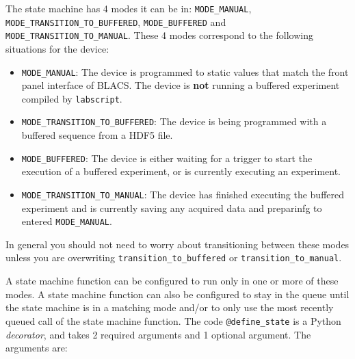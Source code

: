 \documentclass[12pt]{article}
\begin{document}
The state machine has 4 modes it can be in: \texttt{MODE\_MANUAL}, \texttt{MODE\_TRANSITION\_TO\_BUFFERED}, \texttt{MODE\_BUFFERED} and \texttt{MODE\_TRANSITION\_TO\_MANUAL}. These 4 modes correspond to the following situations for the device:

\begin{itemize}
	\item \texttt{MODE\_MANUAL}: The device is programmed to static values that match the front panel interface of BLACS. The device is \textbf{not} running a buffered experiment compiled by \texttt{labscript}.
	\item \texttt{MODE\_TRANSITION\_TO\_BUFFERED}: The device is being programmed with a buffered sequence from a HDF5 file.
	\item \texttt{MODE\_BUFFERED}: The device is either waiting for a trigger to start the execution of a buffered experiment, or is currently executing an experiment.
	\item \texttt{MODE\_TRANSITION\_TO\_MANUAL}: The device has finished executing the buffered experiment and is currently saving any acquired data and preparinfg to entered \texttt{MODE\_MANUAL}.
\end{itemize}

In general you should not need to worry about transitioning between these modes unless you are overwriting \texttt{transition\_to\_buffered} or \texttt{transition\_to\_manual}.

A state machine function can be configured to run only in one or more of these modes.
A state machine function can also be configured to stay in the queue until the state machine is in a matching mode and/or to only use the most recently queued  call of the state machine function.
The code \texttt{@define\_state} is a Python \textit{decorator}, and takes 2 required arguments and 1 optional argument.
The arguments are:
\end{document}
